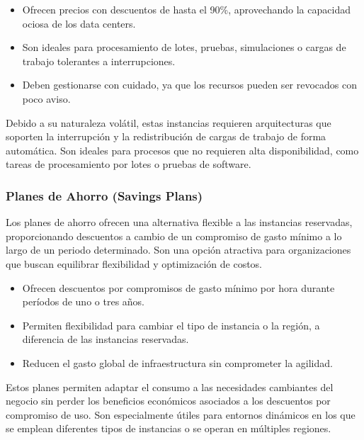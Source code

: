 {                \begin{itemize}
                    \item Ofrecen precios con descuentos de hasta el 90\%, aprovechando la capacidad ociosa de los data centers.
                    \item Son ideales para procesamiento de lotes, pruebas, simulaciones o cargas de trabajo tolerantes a interrupciones.
                    \item Deben gestionarse con cuidado, ya que los recursos pueden ser revocados con poco aviso.
                \end{itemize}

                Debido a su naturaleza volátil, estas instancias requieren arquitecturas que soporten la interrupción y la redistribución de cargas de trabajo de forma automática. Son ideales para procesos que no requieren alta disponibilidad, como tareas de procesamiento por lotes o pruebas de software.
                
            \subsubsection{Planes de Ahorro (Savings Plans)}
                Los planes de ahorro ofrecen una alternativa flexible a las instancias reservadas, proporcionando descuentos a cambio de un compromiso de gasto mínimo a lo largo de un periodo determinado. Son una opción atractiva para organizaciones que buscan equilibrar flexibilidad y optimización de costos.
                
                \begin{itemize}
                    \item Ofrecen descuentos por compromisos de gasto mínimo por hora durante períodos de uno o tres años.
                    \item Permiten flexibilidad para cambiar el tipo de instancia o la región, a diferencia de las instancias reservadas.
                    \item Reducen el gasto global de infraestructura sin comprometer la agilidad.
                \end{itemize}

                Estos planes permiten adaptar el consumo a las necesidades cambiantes del negocio sin perder los beneficios económicos asociados a los descuentos por compromiso de uso. Son especialmente útiles para entornos dinámicos en los que se emplean diferentes tipos de instancias o se operan en múltiples regiones.
                
}

